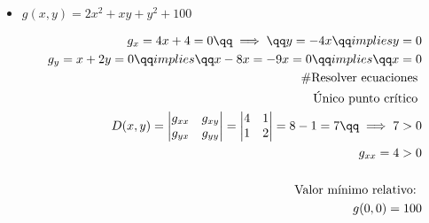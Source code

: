 \begin{enumerate}
\begin{itemize}
            \item $\displaystyle g(x,y) = 2x^2+xy+y^2+100$ 
                \begin{center}
                   \begin{align*}
                       g_x = 4x+4 = 0 \qq \implies \qq y = -4x \qq implies y=0\\ 
                       g_y = x + 2y = 0 \qq implies \qq x-8x=-9x=0 \qq implies \qq x=0\\ 
                       \text{ \#Resolver ecuaciones } \\ 
                        \text{ Único punto crítico } \\ 
                        D(x,y) = \begin{vmatrix}
                            g_{xx} & g_{xy} \\ 
                            g_{yx} & g_{yy} \\ 
                        \end{vmatrix} = \begin{vmatrix}
                            4 & 1 \\ 
                            1 & 2 \\ 
                        \end{vmatrix} = 8-1 = 7 \qq \implies 7 > 0 \\ 
                        g_{xx} = 4>0 \\ 
                        \\
                        \text{ Valor mínimo relativo:  } \\ 
                        g(0,0) = 100 \\ 
                   \end{align*}
                \end{center}
            

\end{itemize}
\end{enumerate}
